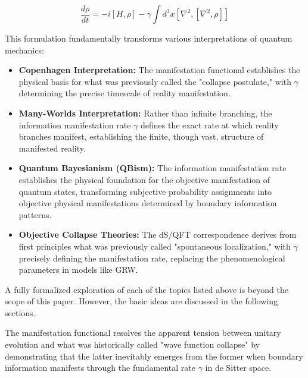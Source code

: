 \documentclass[11pt,english,twoside]{article}
\theoremstyle{plain}
\theoremstyle{definition}
\theoremstyle{remark}
\newcommand{\gammaR}{\gamma}
\begin{document}
\begin{equation}
\frac{d\rho}{dt} = -i[H,\rho] - \gammaR \int d^3x [\nabla^2, [\nabla^2, \rho]]
\end{equation}

This formulation fundamentally transforms various interpretations of quantum mechanics:

\begin{itemize}
    \item \textbf{Copenhagen Interpretation:} The manifestation functional establishes the physical basis for what was previously called the "collapse postulate," with $\gammaR$ determining the precise timescale of reality manifestation.
    
    \item \textbf{Many-Worlds Interpretation:} Rather than infinite branching, the information manifestation rate $\gammaR$ defines the exact rate at which reality branches manifest, establishing the finite, though vast, structure of manifested reality.
    
    \item \textbf{Quantum Bayesianism (QBism):} The information manifestation rate establishes the physical foundation for the objective manifestation of quantum states, transforming subjective probability assignments into objective physical manifestations determined by boundary information patterns.
    
    \item \textbf{Objective Collapse Theories:} The dS/QFT correspondence derives from first principles what was previously called "spontaneous localization," with $\gammaR$ precisely defining the manifestation rate, replacing the phenomenological parameters in models like GRW.
\end{itemize}

A fully formalized exploration of each of the topics listed above is beyond the scope of this paper. However, the basic ideas are discussed in the following sections.

The manifestation functional resolves the apparent tension between unitary evolution and what was historically called "wave function collapse" by demonstrating that the latter inevitably emerges from the former when boundary information manifests through the fundamental rate $\gammaR$ in de Sitter space.
\end{document}
